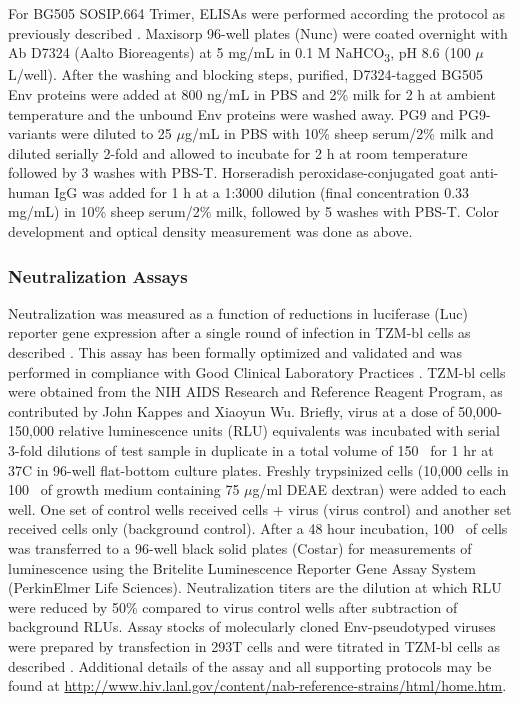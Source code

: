 For BG505 SOSIP.664 Trimer, ELISAs were performed according the protocol as previously described \citep{Sanders:2013gm}. Maxisorp 96-well plates (Nunc) were coated overnight with Ab D7324 (Aalto Bioreagents) at 5 mg/mL in 0.1 M NaHCO\textsubscript{3}, pH 8.6 (100 $\mu$L/well). After the washing and blocking steps, purified, D7324-tagged BG505 Env proteins were added at 800 ng/mL in PBS and 2\% milk for 2 h at ambient temperature and the unbound Env proteins were washed away. PG9 and PG9-variants were diluted to 25 $\mu$g/mL in PBS with 10\% sheep serum/2\% milk and diluted serially 2-fold and allowed to incubate for 2 h at room temperature followed by 3 washes with PBS-T. Horseradish peroxidase-conjugated goat anti-human IgG was added for 1 h at a 1:3000 dilution (final concentration 0.33 mg/mL) in 10\% sheep serum/2\% milk, followed by 5 washes with PBS-T. Color development and optical density measurement was done as above.

\subsubsection{Neutralization Assays}
Neutralization was measured as a function of reductions in luciferase (Luc) reporter gene expression after a single round of infection in TZM-bl cells as described \citep{Montefiori:2009hj,Simek:2009cn}. This assay has been formally optimized and validated and was performed in compliance with Good Clinical Laboratory Practices \citep{SarzottiKelsoe:2013hr}. TZM-bl cells were obtained from the NIH AIDS Research and Reference Reagent Program, as contributed by John Kappes and Xiaoyun Wu.  Briefly, virus at a dose of 50,000-150,000 relative luminescence units (RLU) equivalents was incubated with serial 3-fold dilutions of test sample in duplicate in a total volume of 150 \microliter~for 1 hr at 37\degree C in 96-well flat-bottom culture plates.  Freshly trypsinized cells (10,000 cells in 100 \microliter~of growth medium containing 75 $\mu$g/ml DEAE dextran) were added to each well.  One set of control wells received cells + virus (virus control) and another set received cells only (background control). After a 48 hour incubation, 100 \microliter~of cells was transferred to a 96-well black solid plates (Costar) for measurements of luminescence using the Britelite Luminescence Reporter Gene Assay System (PerkinElmer Life Sciences). Neutralization titers are the dilution at which RLU were reduced by 50\% compared to virus control wells after subtraction of background RLUs.  Assay stocks of molecularly cloned Env-pseudotyped viruses were prepared by transfection in 293T cells and were titrated in TZM-bl cells as described \citep{Li:2005go}. Additional details of the assay and all supporting protocols may be found at \url{http://www.hiv.lanl.gov/content/nab-reference-strains/html/home.htm}.


